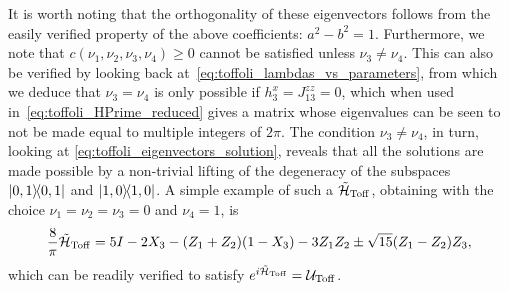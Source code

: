 It is worth noting that the orthogonality of these eigenvectors follows from the easily verified property of the above coefficients: $a^2 - b^2 = 1$.
Furthermore, we note that $c(\nu_1, \nu_2, \nu_3, \nu_4) \ge 0$ cannot be satisfied unless $\nu_3 \neq \nu_4$.
This can also be verified by looking back at~\cref{eq:toffoli_lambdas_vs_parameters}, from which we deduce that $\nu_3=\nu_4$ is only possible if $h_3^x=J_{13}^{zz}=0$, which when used in~\cref{eq:toffoli_HPrime_reduced} gives a matrix whose eigenvalues can be seen to not be made equal to multiple integers of $2\pi$.
The condition $\nu_3\neq\nu_4$, in turn, looking at \cref{eq:toffoli_eigenvectors_solution},
reveals that all the solutions are made possible by a non-trivial lifting of the degeneracy of the subspaces $\ketbra{0,1}$ and $\ketbra{1,0}$.
A simple example of such a $\tilde{{\mathcal{H}}}_{\operatorname{Toff}}$, obtaining with the choice $\nu_1=\nu_2=\nu_3=0$ and $\nu_4=1$, is
\begin{equation}
    \frac{8}{\pi}\tilde{{\mathcal{H}}}_{\operatorname{Toff}} =
    5 I - 2 X_3 - (Z_1 + Z_2)(1 - X_3)
    - 3 Z_1 Z_2 \pm \sqrt{15}(Z_1 - Z_2)Z_3,
\end{equation}
which can be readily verified to satisfy $e^{i\tilde{{\mathcal{H}}}_{\operatorname{Toff}}}={\mathcal{U}}_{\operatorname{Toff}}$.

